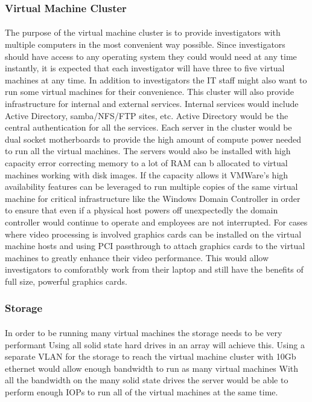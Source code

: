 \documentclass{article}
\begin{document}
\subsubsection{Virtual Machine Cluster}
\paragraph{}
The purpose of the virtual machine cluster is to provide investigators with multiple computers in the most convenient way possible.
Since investigators should have access to any operating system they could would need at any time instantly, it is expected that each investigator will have three to five virtual machines at any time.
In addition to investigators the IT staff might also want to run some virtual machines for their convenience.
This cluster will also provide infrastructure for internal and external services.
Internal services would include Active Directory, samba/NFS/FTP sites, etc.
Active Directory would be the central authentication for all the services.
Each server in the cluster would be dual socket motherboards to provide the high amount of compute power needed to run all the virtual machines.
The servers would also be installed with high capacity error correcting memory to a lot of RAM can b allocated to virtual machines working with disk images.
If the capacity allows it VMWare's high availability features can be leveraged to run multiple copies of the same virtual machine for critical infrastructure like the Windows Domain Controller in order to ensure that even if a physical host powers off unexpectedly the domain controller would continue to operate and employees are not interrupted.
For cases where video processing is involved graphics cards can be installed on the virtual machine hosts and using PCI passthrough to attach graphics cards to the virtual machines to greatly enhance their video performance.
This would allow investigators to comforatbly work from their laptop and still have the benefits of full size, powerful graphics cards.

\subsubsection{Storage}
\paragraph{} 
In order to be running many virtual machines the storage needs to be very performant Using all solid state hard drives in an array will achieve this.
Using a separate VLAN for the storage to reach the virtual machine cluster with 10Gb ethernet would allow enough bandwidth to run as many virtual machines 
With all the bandwidth on the many solid state drives the server would be able to perform enough IOPs to run all of the virtual machines at the same time.
\end{document}
